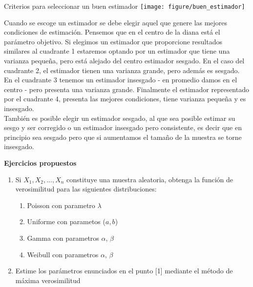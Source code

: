 \documentclass[base=hide,11pt]{elegantbook}
\begin{document}
{\begin{center}
{Criterios para seleccionar un buen estimador}					
\texttt{[image: figure/buen\_estimador]}
\end{center}
				
Cuando se escoge un estimador se debe elegir aquel que genere las mejores condiciones de estimación. Pensemos que en el centro de la diana está el parámetro objetivo. Si elegimos un estimador que proporcione resultados similares al cuadrante 1 estaremos optando por un estimador que tiene una varianza pequeña, pero está alejado del centro estimador	sesgado. En el caso del cuadrante 2, el estimador tienen una varianza grande, pero además es sesgado. En el cuadrante 3 tenemos un estimador insesgado - en promedio damos en el centro - pero presenta una varianza grande. Finalmente el estimador representado por el cuadrante 4, presenta las mejores condiciones, tiene varianza pequeña y es insesgado. \\

También es posible elegir un estimador sesgado, al que sea posible estimar su sesgo y ser corregido o un estimador insesgado pero consistente, es decir que en principio sea sesgado pero que si aumentamos el tamaño de la muestra se torne insesgado.\\
%				
\vspace{1cm}

\textcolor{col4}{\bf \LARGE Ejercicios propuestos} \\
\begin{enumerate} 
\item Si $X_{1},X_{2},...,X_{n}$ constituye una muestra aleatoria, obtenga la función de verosimilitud para las siguientes distribuciones:
					\begin{enumerate}
						\item Poisson con parametro $\lambda$
						\item Uniforme con parametos ($a,b$)
						\item Gamma con parametros $\alpha$, $\beta$
						\item Weibull con parametros $\alpha$, $\beta$
					\end{enumerate}

\item Estime los parámetros enunciados en el punto [1] mediante el método de máxima verosimilitud


\end{enumerate}}
\end{document}
